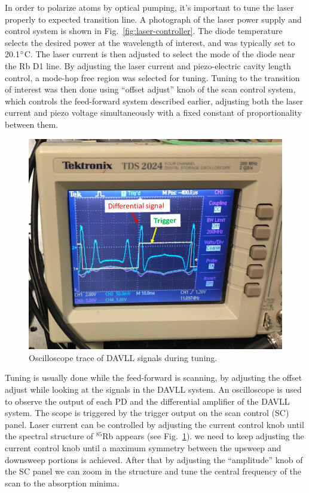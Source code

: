In order to polarize atoms by optical pumping, it's important to tune
the laser properly to expected transition line.  A photograph of the
laser power supply and control system is shown in
Fig.~\ref{fig:laser-controller}.  The diode temperature selects the
desired power at the wavelength of interest, and was typically set to
20.1$\degree$C.  The laser current is then adjusted to select the mode
of the diode near the Rb D1 line.  By adjusting the laser current and
piezo-electric cavity length control, a mode-hop free region was
selected for tuning.  Tuning to the transition of interest was then
done using ``offset adjust'' knob of the scan control system, which
controls the feed-forward system described earlier, adjusting both the
laser current and piezo voltage simultaneously with a fixed constant
of proportionality between them.

\begin{figure}%
\centering
\includegraphics[width=0.85\linewidth]{figures/laser-tune.png}
\caption{Oscilloscope trace of DAVLL signals during
  tuning.\label{fig:laser-tune}}
\end{figure}

Tuning is usually done while the feed-forward is scanning, by
adjusting the offset adjust while looking at the signals in the DAVLL
system.  An oscilloscope is used to observe the output of each PD and
the differential amplifier of the DAVLL system.  The scope is
triggered by the trigger output on the scan control (SC) panel.  Laser
current can be controlled by adjusting the current control knob until
the spectral structure of $^{85}$Rb appears (see
Fig.~\ref{fig:laser-tune}). we need to keep adjusting the current
control knob until a maximum symmetry between the upsweep and
downsweep portions is achieved. After that by adjusting the
``amplitude'' knob of the SC panel we can zoom in the structure and
tune the central frequency of the scan to the absorption minima.

